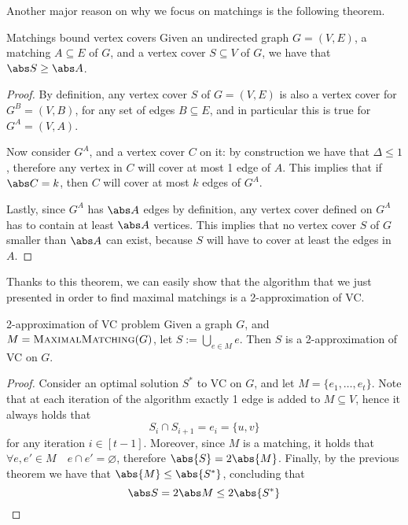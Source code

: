 \documentclass[a4paper, 12pt]{report}
\begin{document}

    Another major reason on why we focus on matchings is the following theorem.

    \begin{framedthm}{Matchings bound vertex covers}
        Given an undirected graph $G = (V, E)$, a matching $A \subseteq E$ of $G$, and a vertex cover $S \subseteq V$ of $G$, we have that $\abs S \ge \abs A$.
    \end{framedthm}

    \begin{proof}
        By definition, any vertex cover $S$ of $G = (V, E)$ is also a vertex cover for $G^B = (V, B)$, for any set of edges $B \subseteq E$, and in particular this is true for $G^A = (V, A)$.

        Now consider $G^A$, and a vertex cover $C$ on it: by construction we have that $\Delta \le 1$, therefore any vertex in $C$ will cover at most 1 edge of $A$. This implies that if $\abs C = k$, then $C$ will cover at most $k$ edges of $G^A$.

        Lastly, since $G^A$ has $\abs A$ edges by definition, any vertex cover defined on $G^A$ has to contain at least $\abs A$ vertices. This implies that no vertex cover $S$ of $G$ smaller than $\abs A$ can exist, because $S$ will have to cover at least the edges in $A$.
    \end{proof}
    
    Thanks to this theorem, we can easily show that the algorithm that we just presented in order to find maximal matchings is a 2-approximation of VC. 

    \begin{framedthm}{2-approximation of VC problem}
        Given a graph $G$, and $M = \textsc{MaximalMatching}(G)$, let $S := \bigcup_{e \in M}{e}$. Then $S$ is a 2-approximation of VC on $G$.
    \end{framedthm}

    \begin{proof}
        Consider an optimal solution $S^*$ to VC on $G$, and let $M = \{e_1, \ldots, e_t\}$. Note that at each iteration of the algorithm exactly 1 edge is added to $M \subseteq V$, hence it always holds that $$S_i \cap S_{i + 1} = e_i = \{u, v\}$$ for any iteration $i \in [t - 1]$. Moreover, since $M$ is a matching, it holds that $\forall e, e' \in M \quad e \cap e' = \varnothing$, therefore $\abs{S} = 2 \abs{M}$. Finally, by the previous theorem we have that $\abs{M} \le \abs{S^*}$, concluding that $$\abs S = 2 \abs M \le 2 \abs{S^*}$$
    \end{proof}
    
\end{document}
